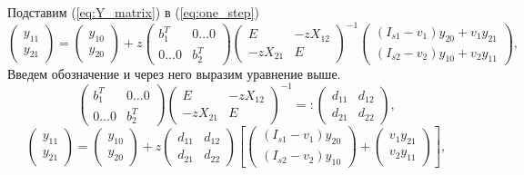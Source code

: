 \documentclass[a4paper,article,14pt]{extarticle}
\begin{document}
Подставим (\ref{eq:Y_matrix}) в (\ref{eq:one_step})
\begin{equation}
    \begin{pmatrix} y_{11}\\ y_{21} \end{pmatrix}
    = 
    \begin{pmatrix} y_{10}\\ y_{20} \end{pmatrix}
    + z
    \begin{pmatrix}
         b_{1}^{T} & 0 \dotsc 0 \\
         0 \dotsc 0 & b_{2}^{T}
    \end{pmatrix}
    \begin{pmatrix}
        E & -z X_{12} \\
        -z X_{21} & E
    \end{pmatrix}^{-1}
    \begin{pmatrix}
        (I_{s1} - v_{1}) y_{20} + v_{1} y_{21} \\
        (I_{s2} - v_{2}) y_{10} + v_{2} y_{11}
    \end{pmatrix},
\end{equation}
Введем обозначение и через него выразим уравнение выше.
\begin{equation}
\begin{pmatrix}
         b_{1}^{T} & 0 \dotsc 0 \\
         0 \dotsc 0 & b_{2}^{T}
    \end{pmatrix}
    \begin{pmatrix}
        E & -z X_{12} \\
        -z X_{21} & E
    \end{pmatrix}^{-1}
=:
\begin{pmatrix}
    d_{11} & d_{12} \\
    d_{21} & d_{22}
\end{pmatrix},
\end{equation}
\begin{equation}
    \begin{pmatrix} y_{11}\\ y_{21} \end{pmatrix}
    = 
    \begin{pmatrix} y_{10}\\ y_{20} \end{pmatrix}
    + z
    \begin{pmatrix}
    d_{11} & d_{12} \\
    d_{21} & d_{22}
    \end{pmatrix}
    \left[
    \begin{pmatrix}
        (I_{s1} - v_{1}) y_{20} \\
        (I_{s2} - v_{2}) y_{10} 
    \end{pmatrix}
    +
    \begin{pmatrix}
        v_{1} y_{21} \\
        v_{2} y_{11} 
    \end{pmatrix}
    \right],
\end{equation}
\end{document}
